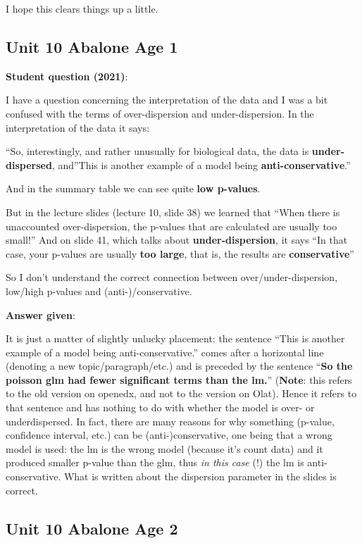 \documentclass[
  letterpaper,
  8pt,
  a4paper]{book}
\begin{document}
I hope this clears things up a little.

\subsection*{Unit 10 Abalone Age 1}\label{unit-10-abalone-age-1}

\textbf{Student question (2021)}:

I have a question concerning the interpretation of the data and I was a
bit confused with the terms of over-dispersion and under-dispersion. In
the interpretation of the data it says:

``So, interestingly, and rather unusually for biological data, the data
is \textbf{under-dispersed}, and''This is another example of a model
being \textbf{anti-conservative}.''

And in the summary table we can see quite \textbf{low p-values}.

But in the lecture slides (lecture 10, slide 38) we learned that ``When
there is unaccounted over-dispersion, the p-values that are calculated
are usually too small!'' And on slide 41, which talks about
\textbf{under-dispersion}, it says ``In that case, your p-values are
usually \textbf{too large}, that is, the results are
\textbf{conservative}''

So I don't understand the correct connection between
over/under-dispersion, low/high p-values and (anti-)/conservative.

\textbf{Answer given}:

It is just a matter of slightly unlucky placement: the sentence ``This
is another example of a model being anti-conservative.'' comes after a
horizontal line (denoting a new topic/paragraph/etc.) and is preceded by
the sentence ``\textbf{So the poisson glm had fewer significant terms
than the lm.}'' (\textbf{Note}: this refers to the old version on
openedx, and not to the version on Olat). Hence it refers to that
sentence and has nothing to do with whether the model is over- or
underdispersed. In fact, there are many reasons for why something
(p-value, confidence interval, etc.) can be (anti-)conservative, one
being that a wrong model is used: the lm is the wrong model (because
it's count data) and it produced smaller p-value than the glm, thus
\emph{in this case} (!) the lm is anti-conservative. What is written
about the dispersion parameter in the slides is correct.

\subsection*{Unit 10 Abalone Age 2}\label{unit-10-abalone-age-2}
\end{document}

